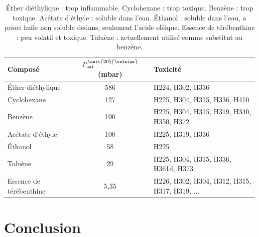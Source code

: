 \documentclass[12pt,a4paper]{article}
\begin{document}
\begin{table}
\center
\begin{tabular}{l|c|l}
\textbf{Composé} & $P_\mathrm{sat}^{\unit{20}{\celsius}}$ (mbar) & \textbf{Toxicité} \\
\hline \hline
Éther diéthylique & 586 & H224, H302, H336 \\
Cyclohexane & 127 & H225, H304, H315, H336, H410 \\
Benzène & 100 & H225, H304, H315, H319, H340, H350, H372 \\
Acétate d'éthyle & 100 & H225, H319, H336 \\
Éthanol & 58 & H225 \\
Toluène & 29 & H225, H304, H315, H336, H361d, H373 \\
Essence de térébenthine  & 5{,}35 &  H226, H302, H304, H312, H315, H317, H319, ... \\
\end{tabular}
\caption{Éther diéthylique : trop inflammable. Cyclohexane : trop toxique. Benzène : trop toxique. Acétate d'éthyle : soluble dans l'eau. Éthanol : soluble dans l'eau, a priori huile non soluble dedans, seulement l'acide oléique. Essence de térébenthine : peu volatil et toxique. Toluène : actuellement utilisé comme substitut au benzène.}
\end{table}

\section*{Conclusion}

\newpage
\appendix




\end{document}
